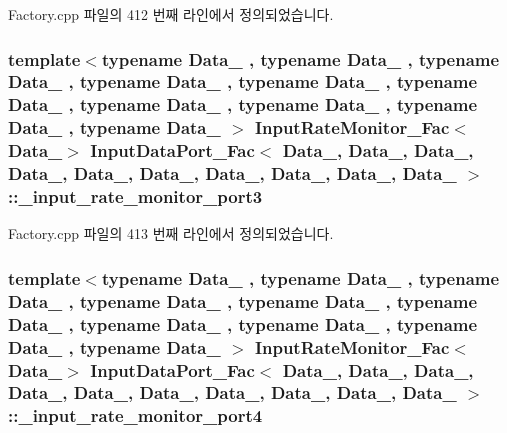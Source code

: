 Factory.\+cpp 파일의 412 번째 라인에서 정의되었습니다.

\subsubsection[{\texorpdfstring{\+\_\+input\+\_\+rate\+\_\+monitor\+\_\+port3}{_input_rate_monitor_port3}}]{\setlength{\rightskip}{0pt plus 5cm}template$<$typename Data\+\_ , typename Data\+\_ , typename Data\+\_ , typename Data\+\_ , typename Data\+\_ , typename Data\+\_ , typename Data\+\_ , typename Data\+\_ , typename Data\+\_ , typename Data\+\_ $>$ {\bf Input\+Rate\+Monitor\+\_\+\+Fac}$<$Data\+\_$>$ {\bf Input\+Data\+Port\+\_\+\+Fac}$<$ Data\+\_, Data\+\_, Data\+\_, Data\+\_, Data\+\_, Data\+\_, Data\+\_, Data\+\_, Data\+\_, Data\+\_ $>$\+::\+\_\+input\+\_\+rate\+\_\+monitor\+\_\+port3\hspace{0.3cm}{\ttfamily [private]}}\hypertarget{classInputDataPort__Fac_a6675cd4e6a4ccb6b2b8c8535aa9cd9f4}{}\label{classInputDataPort__Fac_a6675cd4e6a4ccb6b2b8c8535aa9cd9f4}


Factory.\+cpp 파일의 413 번째 라인에서 정의되었습니다.

\subsubsection[{\texorpdfstring{\+\_\+input\+\_\+rate\+\_\+monitor\+\_\+port4}{_input_rate_monitor_port4}}]{\setlength{\rightskip}{0pt plus 5cm}template$<$typename Data\+\_ , typename Data\+\_ , typename Data\+\_ , typename Data\+\_ , typename Data\+\_ , typename Data\+\_ , typename Data\+\_ , typename Data\+\_ , typename Data\+\_ , typename Data\+\_ $>$ {\bf Input\+Rate\+Monitor\+\_\+\+Fac}$<$Data\+\_$>$ {\bf Input\+Data\+Port\+\_\+\+Fac}$<$ Data\+\_, Data\+\_, Data\+\_, Data\+\_, Data\+\_, Data\+\_, Data\+\_, Data\+\_, Data\+\_, Data\+\_ $>$\+::\+\_\+input\+\_\+rate\+\_\+monitor\+\_\+port4\hspace{0.3cm}{\ttfamily [private]}}\hypertarget{classInputDataPort__Fac_a4fe6b7be1eb68bd69bd8fa62e4a3eb2f}{}\label{classInputDataPort__Fac_a4fe6b7be1eb68bd69bd8fa62e4a3eb2f}



